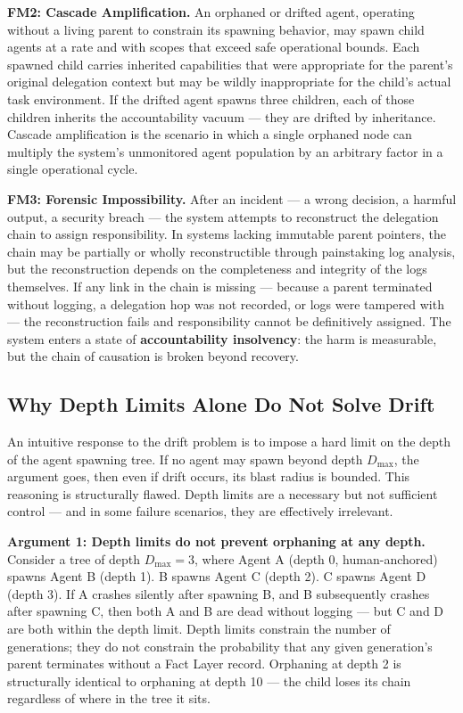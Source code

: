 \bigskip
\noindent\textbf{FM2: Cascade Amplification.} An orphaned or drifted agent, operating without a living parent to constrain its spawning behavior, may spawn child agents at a rate and with scopes that exceed safe operational bounds. Each spawned child carries inherited capabilities that were appropriate for the parent's original delegation context but may be wildly inappropriate for the child's actual task environment. If the drifted agent spawns three children, each of those children inherits the accountability vacuum — they are drifted by inheritance. Cascade amplification is the scenario in which a single orphaned node can multiply the system's unmonitored agent population by an arbitrary factor in a single operational cycle.

\bigskip
\noindent\textbf{FM3: Forensic Impossibility.} After an incident — a wrong decision, a harmful output, a security breach — the system attempts to reconstruct the delegation chain to assign responsibility. In systems lacking immutable parent pointers, the chain may be partially or wholly reconstructible through painstaking log analysis, but the reconstruction depends on the completeness and integrity of the logs themselves. If any link in the chain is missing — because a parent terminated without logging, a delegation hop was not recorded, or logs were tampered with — the reconstruction fails and responsibility cannot be definitively assigned. The system enters a state of \textbf{accountability insolvency}: the harm is measurable, but the chain of causation is broken beyond recovery.

\subsection{Why Depth Limits Alone Do Not Solve Drift}
\label{sec:depth-limits-insufficiency}

An intuitive response to the drift problem is to impose a hard limit on the depth of the agent spawning tree. If no agent may spawn beyond depth $D_{\max}$, the argument goes, then even if drift occurs, its blast radius is bounded. This reasoning is structurally flawed. Depth limits are a necessary but not sufficient control — and in some failure scenarios, they are effectively irrelevant.

\bigskip
\noindent\textbf{Argument 1: Depth limits do not prevent orphaning at any depth.} Consider a tree of depth $D_{\max}=3$, where Agent A (depth 0, human-anchored) spawns Agent B (depth 1). B spawns Agent C (depth 2). C spawns Agent D (depth 3). If A crashes silently after spawning B, and B subsequently crashes after spawning C, then both A and B are dead without logging — but C and D are both within the depth limit. Depth limits constrain the number of generations; they do not constrain the probability that any given generation's parent terminates without a Fact Layer record. Orphaning at depth 2 is structurally identical to orphaning at depth 10 — the child loses its chain regardless of where in the tree it sits.

